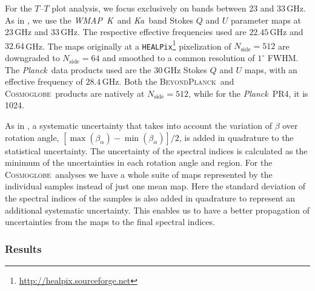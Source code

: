 \documentclass[twocolumn]{../../common/aa}
\def\WMAP{\emph{WMAP}}
\def\Planck{\emph{Planck}}
\def\healpix{\texttt{HEALPix}}
\newcommand{\bp}{\textsc{BeyondPlanck}}
\newcommand{\cosmoglobe}{\textsc{Cosmoglobe}}
\newcommand{\Cosmoglobe}{\textsc{Cosmoglobe}}
\newcommand{\K}[0]{\textit K}
\newcommand{\Ka}[0]{\textit{Ka}}
\begin{document}
For the $T$--$T$ plot  analysis, we focus exclusively on bands between 23 and 33\,GHz. As in \citet{fuskeland2014}, we use the \WMAP\ \K\ and \Ka\ band Stokes $Q$ and $U$ parameter maps at $23$\,GHz and $33$\,GHz. The respective effective frequencies used are $22.45$\,GHz and $32.64$\,GHz. The maps originally at a \healpix\footnote{\url{http://healpix.sourceforge.net}} pixelization of $N_\textrm{side}=512$ are downgraded to $N_\textrm{side}=64$ and smoothed to a common resolution of $1^\circ$ FWHM.
The \Planck\ data products used are the $30$\,GHz Stokes $Q$ and $U$ maps, with an effective frequency of $28.4$\,GHz. Both the \bp\ and \cosmoglobe\ products are natively at $N_\textrm{side}=512$, while for the \Planck\ PR4, it is 1024.





As in \citet{fuskeland:2019}, a systematic uncertainty that takes into account the variation of $\beta$ over rotation angle, $[ \max(\beta_\alpha) - \min(\beta_\alpha) ] /2$, is added in quadrature to the statistical uncertainty.
The uncertainty of the spectral indices is calculated as the minimum of the uncertainties in each rotation angle and region. 
For the \Cosmoglobe\ analyses we have a whole suite of maps represented by the individual samples instead of just one mean map. Here the standard deviation of the spectral indices of the samples is also added in quadrature to represent an additional systematic uncertainty. This enables us to have a better propagation of uncertainties from the maps to the final spectral indices.




\subsubsection{Results}
\label{sec:tt_plot_results}
\end{document}
